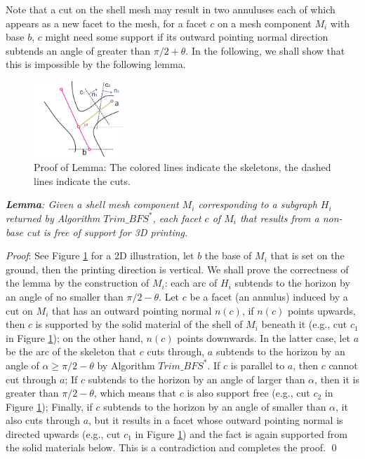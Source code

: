 {{Note that a cut on the shell mesh may result in two annuluses each of which appears as a new facet to the mesh, for a facet $c$ on a mesh component $M_i$ with base $b$, $c$ might need some support if its outward pointing normal direction subtends an angle of greater than $\pi/2 + \theta$. In the following, we shall show that this is impossible by the following lemma.

\begin{figure}[ht]
  \centering
  \includegraphics[width=0.3\textwidth]{figs/nonbasecut.pdf}
  \caption{\label{fig:nonbasecut}%
           Proof of Lemma: The colored lines indicate the skeletons, the dashed lines indicate the cuts.}
\end{figure}



\emph{\textbf{Lemma}: Given a shell mesh component $M_i$ corresponding to a subgraph $H_i$ returned by Algorithm $Trim\_BFS^*$, each facet $c$ of $M_i$ that results from a non-base cut is free of support for 3D printing.}

\emph{Proof}:  See Figure \ref{fig:nonbasecut} for a 2D illustration, let $b$ the base of $M_i$ that is set on the ground, then the printing direction is vertical. We shall prove the correctness of the lemma by the construction of $M_i$: each arc of $H_i$ subtends to the horizon by an angle of no smaller than $\pi/2 - \theta$. Let $c$ be a facet (an annulus) induced by a cut on $M_i$ that has an outward pointing normal $n(c)$, if $n(c)$ points upwards, then $c$ is supported by the solid material of the shell of $M_i$ beneath it (e.g., cut $c_1$ in Figure \ref{fig:nonbasecut}); on the other hand, $n(c)$ points downwards. In the latter case, let $a$ be the arc of the skeleton that $c$ cuts through, $a$ subtends to the horizon by an angle of $\alpha \geq  \pi/2 - \theta$ by Algorithm $Trim\_BFS^*$. If $c$ is parallel to $a$, then $c$ cannot cut through $a$; If $c$ subtends to the horizon by an angle of larger than $\alpha$, then it is greater than $\pi/2 - \theta$, which means that $c$ is also support free (e.g., cut $c_2$ in Figure \ref{fig:nonbasecut}); Finally, if $c$ subtends to the horizon by an angle of smaller than $\alpha$, it also cuts through $a$, but it results in a facet whose outward pointing normal is directed upwards (e.g., cut $c_1$ in Figure \ref{fig:nonbasecut}) and the fact is again supported from the solid materials below. This is a contradiction and completes the proof. \qed }}


